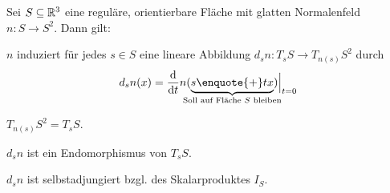 \begin{proposition}\label{prop:5.1}
    Sei $S \subseteq \mathbb{R}^3$ eine reguläre, orientierbare Fläche mit glatten
    Normalenfeld $n: S \rightarrow S^2$. Dann gilt:

    \begin{propenum}
        \item \label{prop:5.1a} $n$ induziert für jedes $s \in S$ eine lineare Abbildung $d_s n: T_s S \rightarrow T_{n(s)} S^2$
              durch 
              \[d_s n(x) = \frac{\mathrm{d}}{\mathrm{d} t} n (\underbrace{s \text{\enquote{+}} tx}_{\mathclap{\text{Soll auf Fläche $S$ bleiben}}}) \Bigr |_{t=0}\]
        \item $T_{n(s)} S^2 = T_s S$.
        \item $d_s n$ ist ein Endomorphismus von $T_s S$.
        \item $d_s n$ ist selbstadjungiert bzgl. des Skalarproduktes $I_S$.
    \end{propenum}
\end{proposition}

